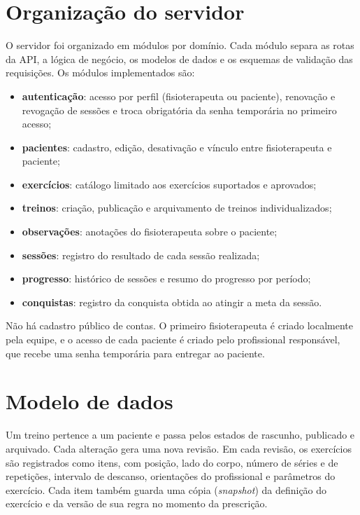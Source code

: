 \section{Organização do servidor}
\label{sec:servidor}

O servidor foi organizado em módulos por domínio. Cada módulo separa as rotas da API, a lógica de negócio, os modelos de dados e os esquemas de validação das requisições. Os módulos implementados são:

\begin{itemize}
    \item \textbf{autenticação}: acesso por perfil (fisioterapeuta ou paciente), renovação e revogação de sessões e troca obrigatória da senha temporária no primeiro acesso;
    \item \textbf{pacientes}: cadastro, edição, desativação e vínculo entre fisioterapeuta e paciente;
    \item \textbf{exercícios}: catálogo limitado aos exercícios suportados e aprovados;
    \item \textbf{treinos}: criação, publicação e arquivamento de treinos individualizados;
    \item \textbf{observações}: anotações do fisioterapeuta sobre o paciente;
    \item \textbf{sessões}: registro do resultado de cada sessão realizada;
    \item \textbf{progresso}: histórico de sessões e resumo do progresso por período;
    \item \textbf{conquistas}: registro da conquista obtida ao atingir a meta da sessão.
\end{itemize}

Não há cadastro público de contas. O primeiro fisioterapeuta é criado localmente pela equipe, e o acesso de cada paciente é criado pelo profissional responsável, que recebe uma senha temporária para entregar ao paciente.

\section{Modelo de dados}
\label{sec:modelo-dados}

Um treino pertence a um paciente e passa pelos estados de rascunho, publicado e arquivado. Cada alteração gera uma nova revisão. Em cada revisão, os exercícios são registrados como itens, com posição, lado do corpo, número de séries e de repetições, intervalo de descanso, orientações do profissional e parâmetros do exercício. Cada item também guarda uma cópia (\textit{snapshot}) da definição do exercício e da versão de sua regra no momento da prescrição.

